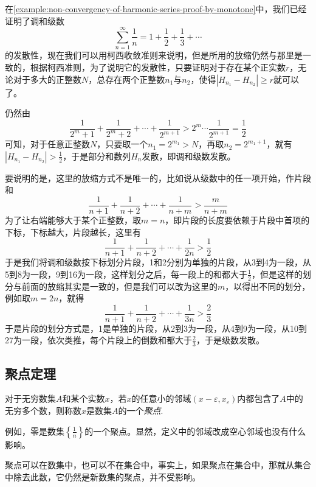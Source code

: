 \begin{example}[调和级数的发散性]
  \label{example:non-convergency-of-harmonic-series-proof-by-cauchy}
  在\autoref{example:non-convergency-of-harmonic-series-proof-by-monotone}中，我们已经证明了调和级数
  \[ \sum_{n=1}^{\infty} \frac{1}{n} = 1+\frac{1}{2} + \frac{1}{3} + \cdots  \]
  的发散性，现在我们可以用柯西收敛准则来说明，但是所用的放缩仍然与那里是一致的，根据柯西准则，为了说明它的发散性，只要证明对于存在某个正实数$r$，无论对于多大的正整数$N$，总存在两个正整数$n_1$与$n_2$，使得$|H_{n_1}-H_{n_2}|\geqslant r$就可以了。

  仍然由
  \[ \frac{1}{2^m+1} + \frac{1}{2^m+2} + \cdots + \frac{1}{2^{m+1}} > 2^m \cdots \frac{1}{2^{m+1}} = \frac{1}{2} \]
可知，对于任意正整数$N$，只要取一个$n_1=2^{m_1}>N$，再取$n_2=2^{m_1+1}$，就有$|H_{n_1}-H_{n_2}|>\frac{1}{2}$，于是部分和数列$H_n$发散，即调和级数发散。

要说明的是，这里的放缩方式不是唯一的，比如说从级数中的任一项开始，作片段和
\[ \frac{1}{n+1} + \frac{1}{n+2} + \cdots + \frac{1}{n+m} > \frac{m}{n+m} \]
为了让右端能够大于某个正整数，取$m=n$，即片段的长度要依赖于片段中首项的下标，下标越大，片段越长，这里有
\[ \frac{1}{n+1} + \frac{1}{n+2} + \cdots + \frac{1}{2n} > \frac{1}{2} \]
于是我们将调和级数按下标划分片段，1和2分别为单独的片段，从3到4为一段，从5到8为一段，9到16为一段，这样划分之后，每一段上的和都大于$\frac{1}{2}$，但是这样的划分与前面的放缩其实是一致的，但是我们可以改为这里的$m$，以得出不同的划分，例如取$m=2n$，就得
\[ \frac{1}{n+1} + \frac{1}{n+2} + \cdots + \frac{1}{3n} > \frac{2}{3} \]
于是片段的划分方式是，1是单独的片段，从2到3为一段，从4到9为一段，从10到27为一段，依次类推，每个片段上的倒数和都大于$\frac{2}{3}$，于是级数发散。
\end{example}

\subsection{聚点定理}
\label{sec:accumulate-point-theorem}

\begin{definition}
  对于无穷数集$A$和某个实数$x$，若$x$的任意小的邻域$(x-\varepsilon,x_{\varepsilon})$内都包含了$A$中的无穷多个数，则称数$x$是数集$A$的一个\emph{聚点}.
\end{definition}

例如，零是数集$\left\{ \frac{1}{n} \right\}$的一个聚点。显然，定义中的邻域改成空心邻域也没有什么影响。

聚点可以在数集中，也可以不在集合中，事实上，如果聚点在集合中，那就从集合中除去此数，它仍然是新数集的聚点，并不受影响。

